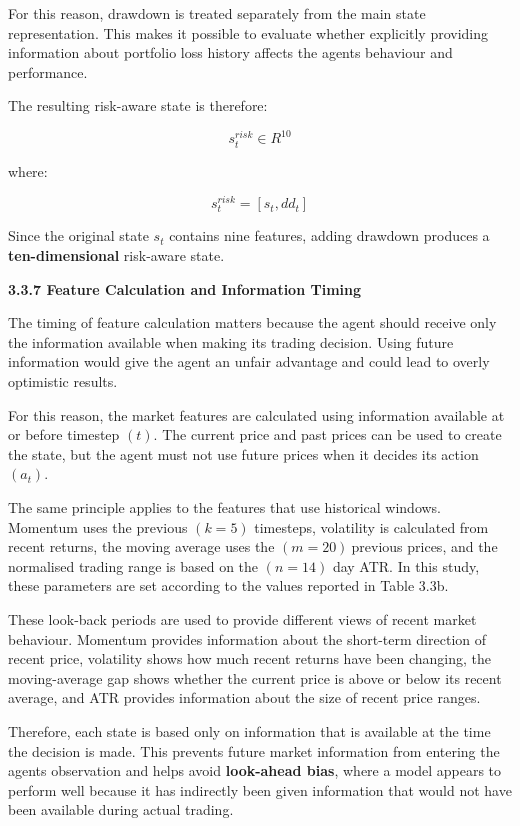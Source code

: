 For this reason, drawdown is treated separately from the main state
representation. This makes it possible to evaluate whether explicitly
providing information about portfolio loss history affects the
agent\textquotesingle s behaviour and performance.

The resulting risk-aware state is therefore:

\[s_{t}^{risk} \in R^{10}\]

where:

\[s_{t}^{risk} = \left\lbrack s_{t},dd_{t} \right\rbrack\]

Since the original state \(s_{t}\) contains nine features, adding
drawdown produces a \textbf{ten-dimensional} risk-aware state.

\textbf{3.3.7 Feature Calculation and Information Timing}

The timing of feature calculation matters because the agent should
receive only the information available when making its trading decision.
Using future information would give the agent an unfair advantage and
could lead to overly optimistic results.

For this reason, the market features are calculated using information
available at or before timestep \((t)\). The current price and past
prices can be used to create the state, but the agent must not use
future prices when it decides its action \((a_{t})\).

The same principle applies to the features that use historical windows.
Momentum uses the previous \((k = 5)\) timesteps, volatility is
calculated from recent returns, the moving average uses the
\((m = 20)\ \)previous prices, and the normalised trading range is based
on the \((n = 14)\) day ATR. In this study, these parameters are set
according to the values reported in Table 3.3b.

These look-back periods are used to provide different views of recent
market behaviour. Momentum provides information about the short-term
direction of recent price, volatility shows how much recent returns have
been changing, the moving-average gap shows whether the current price is
above or below its recent average, and ATR provides information about
the size of recent price ranges.

Therefore, each state is based only on information that is available at
the time the decision is made. This prevents future market information
from entering the agent\textquotesingle s observation and helps avoid
\textbf{look-ahead bias}, where a model appears to perform well because
it has indirectly been given information that would not have been
available during actual trading.

